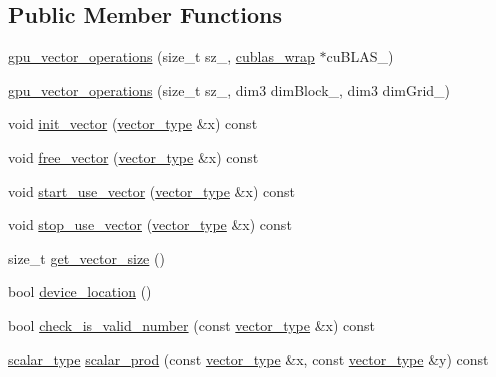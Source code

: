 \subsection*{Public Member Functions}
\begin{DoxyCompactItemize}
\item 
\hyperlink{structgpu__vector__operations_a785ac0a2796cb92fd68a67dd9375af84}{gpu\-\_\-vector\-\_\-operations} (size\-\_\-t sz\-\_\-, \hyperlink{classcublas__wrap}{cublas\-\_\-wrap} $\ast$cu\-B\-L\-A\-S\-\_\-)
\item 
\hyperlink{structgpu__vector__operations_a1df6cc804664fad7062af48752586dfa}{gpu\-\_\-vector\-\_\-operations} (size\-\_\-t sz\-\_\-, dim3 dim\-Block\-\_\-, dim3 dim\-Grid\-\_\-)
\item 
void \hyperlink{structgpu__vector__operations_a124097d448c6826c614a5268809fe62e}{init\-\_\-vector} (\hyperlink{structgpu__vector__operations_adfa9fd444da5616e33af37604dc206ba}{vector\-\_\-type} \&x) const 
\item 
void \hyperlink{structgpu__vector__operations_ad022242c625930deb1edbbc3feeaa7e2}{free\-\_\-vector} (\hyperlink{structgpu__vector__operations_adfa9fd444da5616e33af37604dc206ba}{vector\-\_\-type} \&x) const 
\item 
void \hyperlink{structgpu__vector__operations_a1652c1a3d2a100a360bd3900f710130a}{start\-\_\-use\-\_\-vector} (\hyperlink{structgpu__vector__operations_adfa9fd444da5616e33af37604dc206ba}{vector\-\_\-type} \&x) const 
\item 
void \hyperlink{structgpu__vector__operations_a55245a5e00684ba5e124ef498f1ea575}{stop\-\_\-use\-\_\-vector} (\hyperlink{structgpu__vector__operations_adfa9fd444da5616e33af37604dc206ba}{vector\-\_\-type} \&x) const 
\item 
size\-\_\-t \hyperlink{structgpu__vector__operations_a31910d81b38523c4a5c0d53bbcc0bcbb}{get\-\_\-vector\-\_\-size} ()
\item 
bool \hyperlink{structgpu__vector__operations_a1c88b3d127cf3e4a3cf0404b4207b411}{device\-\_\-location} ()
\item 
bool \hyperlink{structgpu__vector__operations_a5ec9caaaea80e77ad8f93c8434cdc506}{check\-\_\-is\-\_\-valid\-\_\-number} (const \hyperlink{structgpu__vector__operations_adfa9fd444da5616e33af37604dc206ba}{vector\-\_\-type} \&x) const 
\item 
\hyperlink{structgpu__vector__operations_aaa9d1dc877967fabc2262c4a25e4796f}{scalar\-\_\-type} \hyperlink{structgpu__vector__operations_a82b58908b36be4cf2e7ee49594ab3d77}{scalar\-\_\-prod} (const \hyperlink{structgpu__vector__operations_adfa9fd444da5616e33af37604dc206ba}{vector\-\_\-type} \&x, const \hyperlink{structgpu__vector__operations_adfa9fd444da5616e33af37604dc206ba}{vector\-\_\-type} \&y) const 

\end{DoxyCompactItemize}
